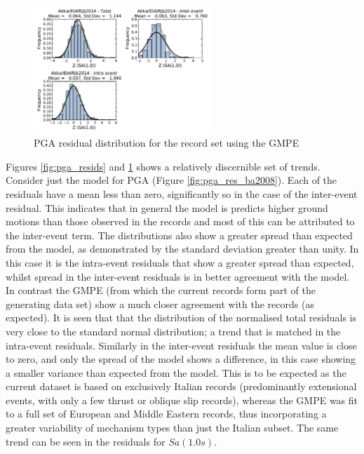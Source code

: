 \begin{figure}[htb]
	\centering
		\includegraphics[width=0.6\textwidth]{./figures/residuals/Akkar2014_Residuals_Sa1.pdf}
	\caption{PGA residual distribution for the record set using the \textcite{Akkar_etal2014} GMPE}
	\label{fig:sa1_res_akkar2014}
\end{figure}

Figures \ref{fig:pga_resids} and \ref{fig:sa1_res_akkar2014} shows a relatively discernible set of trends. Consider just the \textcite{boore2008} model for PGA (Figure \ref{fig:pga_res_ba2008}). Each of the residuals have a mean less than zero, significantly so in the case of the inter-event residual. This indicates that in general the \textcite{boore2008} model is predicts higher ground motions than those observed in the records and most of this can be attributed to the inter-event term. The distributions also show a greater spread than expected from the model, as demonstrated by the standard deviation greater than unity. In this case it is the intra-event residuals that show a greater spread than expected, whilst spread in the inter-event residuals is in better agreement with the model. In contrast the \textcite{Akkar_etal2014} GMPE (from which the current records form part of the generating data set) show a much closer agreement with the records (as expected). It is seen that that the distribution of the normalised total residuals is very close to the standard normal distribution; a trend that is matched in the intra-event residuals. Similarly in the inter-event residuals the mean value is close to zero, and only the spread of the model shows a difference, in this case showing a smaller variance than expected from the model. This is to be expected as the current dataset is based on exclusively Italian records (predominantly extensional events, with only a few thrust or oblique slip records), whereas the GMPE was fit to a full set of European and Middle Eastern records, thus incorporating a greater variability of mechanism types than just the Italian subset. The same trend can be seen in the residuals for $Sa \left( {1.0 s} \right)$. 


